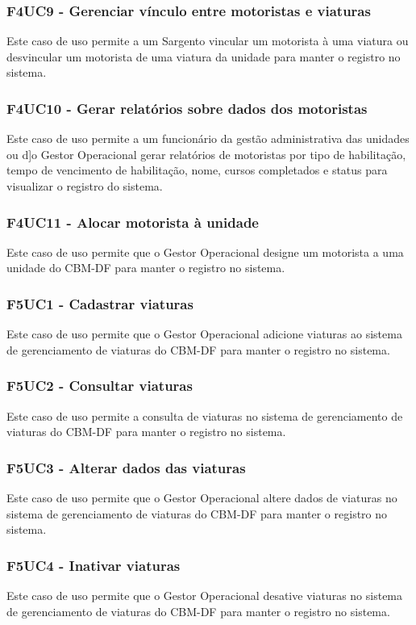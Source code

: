   \subsubsection{F4UC9 - Gerenciar vínculo entre motoristas e viaturas}
Este caso de uso permite a um Sargento vincular um motorista à uma viatura ou desvincular um motorista de uma viatura da unidade
para manter o registro no sistema.

  \subsubsection{F4UC10 - Gerar relatórios sobre dados dos motoristas}
Este caso de uso permite a um funcionário da gestão administrativa das unidades ou d]o Gestor Operacional gerar relatórios de 
motoristas por tipo de habilitação, tempo de vencimento de habilitação, nome, cursos completados e status para visualizar
o registro do sistema.

  \subsubsection{F4UC11 - Alocar motorista à unidade}
Este caso de uso permite que o Gestor Operacional designe um motorista a uma unidade do CBM-DF para manter o registro no sistema.

  \subsubsection{F5UC1 - Cadastrar viaturas}
Este caso de uso permite que o Gestor Operacional adicione viaturas ao sistema de gerenciamento de viaturas do CBM-DF 
para manter o registro no sistema.

  \subsubsection{F5UC2 - Consultar viaturas}
Este caso de uso permite a consulta de viaturas no sistema de gerenciamento de viaturas do CBM-DF para manter o registro no sistema.

  \subsubsection{F5UC3 - Alterar dados das viaturas}
Este caso de uso permite que o Gestor Operacional altere dados de viaturas no sistema de gerenciamento de viaturas do 
CBM-DF para manter o registro no sistema.

  \subsubsection{F5UC4 - Inativar viaturas}
Este caso de uso permite que o Gestor Operacional desative viaturas no sistema de gerenciamento de viaturas do CBM-DF para 
manter o registro no sistema.

